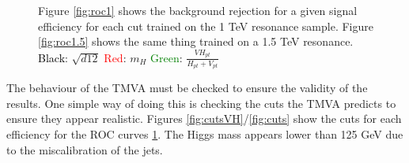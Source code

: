 \begin{figure}[H]
\hspace{-2.5cm}
\caption{Figure \ref{fig:roc1} shows the background rejection for a given signal efficiency for each cut trained on the 1 TeV resonance sample. Figure \ref{fig:roc1.5} shows the same thing trained on a 1.5 TeV resonance.
\textcolor{black}{Black}: $\sqrt{d12}$
\textcolor{red}{Red}: $m_{H}$
\textcolor{green}{Green}: $\frac{VH_{pt}}{H_{pt}+V_{pt}}$
}
\label{fig:roc}
\end{figure}

The behaviour of the TMVA must be checked to ensure the validity of the results. One simple way of doing this is checking the cuts the TMVA predicts to ensure they appear realistic. Figures \ref{fig:cutsVH}/\ref{fig:cuts} show the cuts for each efficiency for the ROC curves \ref{fig:roc}. The Higgs mass appears lower than 125 GeV due to the miscalibration of the jets. 

